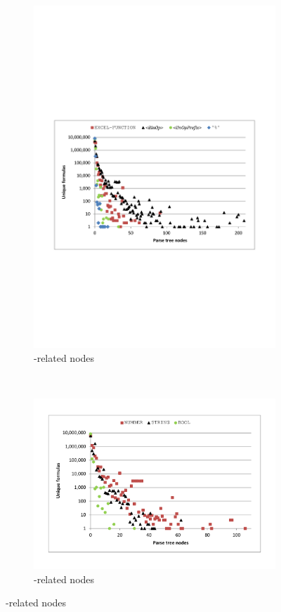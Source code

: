 \documentclass[times]{smrauth}
\begin{document}
\begin{figure}
	\centering
	\begin{subfigure}[b]{0.49\textwidth}
		\centering
		\includegraphics[width=1\textwidth]{img/nodesFunctions}
		\caption{-related nodes}
		\label{fig:nodesFunctions}
	\end{subfigure}
	~
	\begin{subfigure}[b]{0.49\textwidth}
		\centering
		\includegraphics[width=1\textwidth]{img/nodesConstants}
		\caption{-related nodes}
		\label{fig:nodesConstants}
	\end{subfigure}


\end{figure}
\end{document}
